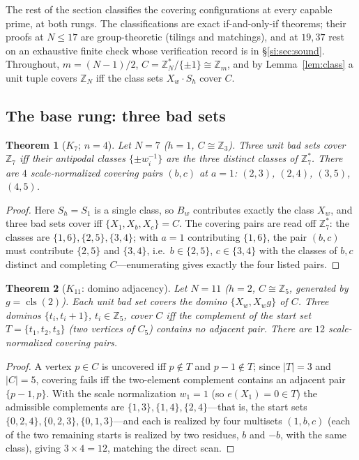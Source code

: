 \documentclass[11pt,a4paper]{article}
\numberwithin{equation}{section}
\theoremstyle{plain}
\theoremstyle{plain}
\newtheorem{theorem}{Theorem}[section]
\theoremstyle{definition}
\theoremstyle{remark}
\newcommand{\Z}{\mathbb{Z}}
\DeclareMathOperator{\cls}{cls}
\begin{document}
The rest of the section classifies the covering configurations at every
capable prime, at both rungs. The classifications are exact
if-and-only-if theorems; their proofs at $N\le 17$ are group-theoretic
(tilings and matchings), and at $19,37$ rest on an exhaustive finite check
whose verification record is in \S\ref{si:sec:sound}. Throughout,
$m=(N-1)/2$, $C=\Z_N^\ast/\{\pm1\}\cong\Z_m$, and by
Lemma~\ref{lem:class} a unit tuple covers $\Z_N$ iff the class sets
$X_w\cdot S_h$ cover $C$.

\subsection{The base rung: three bad sets}\label{sec:K4}

\begin{theorem}[$K_7$; $n=4$]\label{thm:K4}
Let $N=7$ ($h=1$, $C\cong\Z_3$). Three unit bad sets cover $\Z_7$ iff
their antipodal classes $\{\pm w_i^{-1}\}$ are the three distinct classes
of $\Z_7^\ast$. There are $4$ scale-normalized covering pairs
$(b,c)$ at $a=1$: $(2,3)$, $(2,4)$, $(3,5)$, $(4,5)$.
\end{theorem}

\begin{proof}
Here $S_h=S_1$ is a single class, so $B_w$ contributes exactly the class
$X_w$, and three bad sets cover iff $\{X_1,X_b,X_c\}=C$. The covering
pairs are read off $\Z_7^\ast$: the classes are
$\{1,6\},\{2,5\},\{3,4\}$; with $a=1$ contributing $\{1,6\}$, the pair
$(b,c)$ must contribute $\{2,5\}$ and $\{3,4\}$, i.e.\
$b\in\{2,5\}$, $c\in\{3,4\}$ with the classes of $b,c$ distinct and
completing $C$---enumerating gives exactly the four listed pairs.
\end{proof}

\begin{theorem}[$K_{11}$: domino adjacency]\label{thm:K11}
Let $N=11$ ($h=2$, $C\cong\Z_5$, generated by $g=\cls(2)$). Each unit
bad set covers the \emph{domino} $\{X_w,X_w g\}$ of $C$. Three dominos
$\{t_i,t_i+1\}$, $t_i\in\Z_5$, cover $C$ iff the complement of the start
set $T=\{t_1,t_2,t_3\}$ (two vertices of $C_5$) contains no adjacent
pair. There are $12$ scale-normalized covering pairs.
\end{theorem}

\begin{proof}
A vertex $p\in C$ is uncovered iff $p\notin T$ and $p-1\notin T$; since
$|T|=3$ and $|C|=5$, covering fails iff the two-element complement
contains an adjacent pair $\{p-1,p\}$. With the scale normalization
$w_1=1$ (so $e(X_1)=0\in T$) the admissible complements are
$\{1,3\},\{1,4\},\{2,4\}$---that is, the start sets
$\{0,2,4\},\{0,2,3\},\{0,1,3\}$---and each is realized by four
multisets $(1,b,c)$ (each of the two remaining starts is realized by two
residues, $b$ and $-b$, with the same class), giving $3\times 4=12$,
matching the direct scan.
\end{proof}
\end{document}
